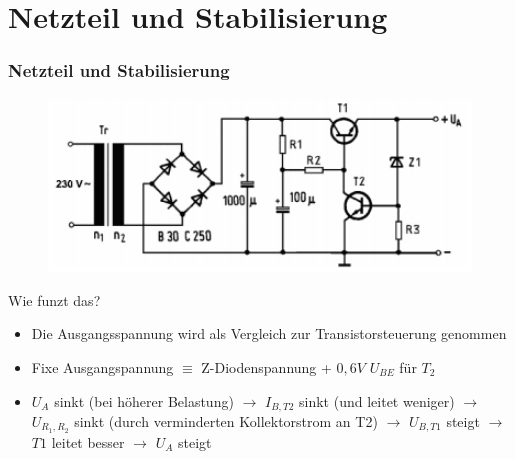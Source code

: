 \section*{Netzteil und Stabilisierung}
\begin{frame}
  \frametitle{Netzteil und Stabilisierung}
  \begin{center}
    \begin{figure}
      \includegraphics[width=1\textwidth,height=.35\textheight,keepaspectratio]{a17/TD306.png}
    \end{figure}
  \end{center}
  Wie funzt das?
  \begin{itemize}
    \item Die Ausgangsspannung wird als Vergleich zur Transistorsteuerung genommen
    \item Fixe Ausgangspannung $\equiv$ Z-Diodenspannung + $0,6V$ $U_{BE}$ für $T_2$
    \item $U_A$ sinkt (bei höherer Belastung) $\rightarrow$ $I_{B,T2}$ sinkt (und leitet weniger) $\rightarrow$ $U_{R_1,R_2}$ sinkt (durch verminderten Kollektorstrom an T2) $\rightarrow$ $U_{B,T1}$ steigt $\rightarrow$ $T1$ leitet besser $\rightarrow$ $U_A$ steigt
  \end{itemize}
\end{frame}

